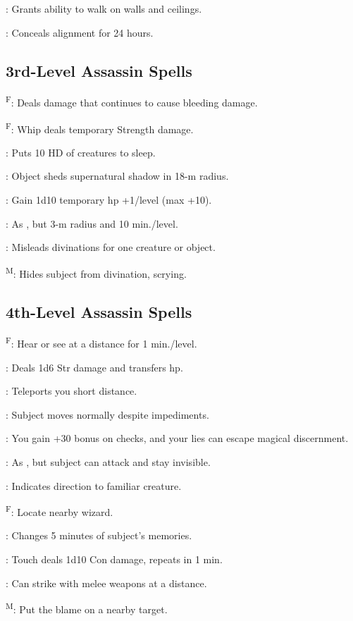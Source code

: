 : Grants ability to walk on walls and ceilings.

: Conceals alignment for 24 hours.




\subsection{3rd-Level Assassin Spells}

\textsuperscript{F}: Deals damage that continues to cause bleeding damage.%

\textsuperscript{F}: Whip deals temporary Strength damage. %

: Puts 10 HD of creatures to sleep.

: Object sheds supernatural shadow in 18-m radius.

: Gain 1d10 temporary hp +1/level (max +10).

: As , but 3-m radius and 10 min./level.

: Misleads divinations for one creature or object.

\textsuperscript{M}: Hides subject from divination, scrying.




\subsection{4th-Level Assassin Spells}

\textsuperscript{F}: Hear or see at a distance for 1 min./level.

: Deals 1d6 Str damage and transfers hp. %

: Teleports you short distance.

: Subject moves normally despite impediments.

: You gain +30 bonus on  checks, and your lies can escape magical discernment.

: As , but subject can attack and stay invisible.

: Indicates direction to familiar creature.

\textsuperscript{F}: Locate nearby wizard. %

: Changes 5 minutes of subject's memories.

: Touch deals 1d10 Con damage, repeats in 1 min.

: Can strike with melee weapons at a distance. %

\textsuperscript{M}: Put the blame on a nearby target. %
